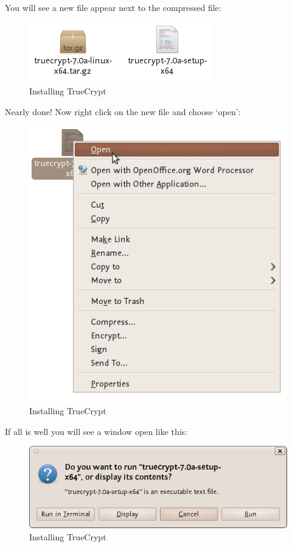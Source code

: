 You will see a new file appear next to the compressed file:

\begin{figure}[htbp]
\centering
\includegraphics{tc_004.png}
\caption{Installing TrueCrypt}
\end{figure}

Nearly done! Now right click on the new file and choose `open':

\begin{figure}[htbp]
\centering
\includegraphics{tc_005.png}
\caption{Installing TrueCrypt}
\end{figure}

If all is well you will see a window open like this:

\begin{figure}[htbp]
\centering
\includegraphics{tc_006.png}
\caption{Installing TrueCrypt}
\end{figure}

